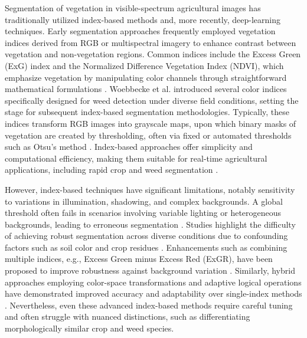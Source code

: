 \documentclass[agriculture,article,submit,pdftex,moreauthors]{Definitions/mdpi}
\begin{document}
Segmentation of vegetation in visible-spectrum agricultural images has traditionally utilized index-based methods and, more recently, deep-learning techniques. Early segmentation approaches frequently employed vegetation indices derived from RGB or multispectral imagery to enhance contrast between vegetation and non-vegetation regions. Common indices include the Excess Green (ExG) index and the Normalized Difference Vegetation Index (NDVI), which emphasize vegetation by manipulating color channels through straightforward mathematical formulations \cite{Woebbecke1995-bw}. Woebbecke et al. \cite{Woebbecke1995-bw} introduced several color indices specifically designed for weed detection under diverse field conditions, setting the stage for subsequent index-based segmentation methodologies. Typically, these indices transform RGB images into grayscale maps, upon which binary masks of vegetation are created by thresholding, often via fixed or automated thresholds such as Otsu's method \cite{Riehle2020-lx}. Index-based approaches offer simplicity and computational efficiency, making them suitable for real-time agricultural applications, including rapid crop and weed segmentation \cite{Hamuda2016-dw, Guerrero2012-zi}.

However, index-based techniques have significant limitations, notably sensitivity to variations in illumination, shadowing, and complex backgrounds. A global threshold often fails in scenarios involving variable lighting or heterogeneous backgrounds, leading to erroneous segmentation \cite{Hamuda2016-dw}. Studies highlight the difficulty of achieving robust segmentation across diverse conditions due to confounding factors such as soil color and crop residues \cite{Woebbecke1995-bw, Guerrero2012-zi}. Enhancements such as combining multiple indices, e.g., Excess Green minus Excess Red (ExGR), have been proposed to improve robustness against background variation \cite{Hamuda2016-dw}. Similarly, hybrid approaches employing color-space transformations and adaptive logical operations have demonstrated improved accuracy and adaptability over single-index methods \cite{Riehle2020-lx}. Nevertheless, even these advanced index-based methods require careful tuning and often struggle with nuanced distinctions, such as differentiating morphologically similar crop and weed species.
\end{document}
